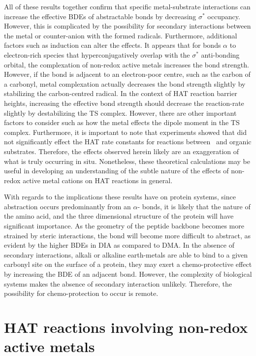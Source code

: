 All of these results together confirm that specific metal-substrate interactions
can increase the effective BDEs of abstractable  bonds by decreasing
 $\sigma^*$ occupancy. However, this is complicated by the possibility
for secondary interactions between the metal or counter-anion with the formed
radicals. Furthermore, additional factors such as induction can alter the
effects. It appears that for  bonds $\alpha$ to electron-rich species
that hyperconjugatively overlap with the $\sigma^*$ anti-bonding orbital, the
complexation of non-redox active metals increases the  bond strength.
However, if the  bond is adjacent to an electron-poor centre, such as
the carbon of a carbonyl, metal complexation actually decreases the bond
strength slightly by stabilizing the carbon-centred radical. In the context of
HAT reaction barrier heights, increasing the effective  bond strength
should decrease the reaction-rate slightly by destabilizing the TS complex.
However, there are other important factors to consider such as how the metal
effects the dipole moment in the TS complex. Furthermore, it is important to
note that experiments showed that  did not significantly effect the
HAT rate constants for reactions between \cumo\ and organic substrates.
Therefore, the effects observed herein likely are an exaggeration of what is
truly occurring in situ. Nonetheless, these theoretical calculations may be
useful in developing an understanding of the subtle nature of the effects of
non-redox active metal cations on HAT reactions in general.

With regards to the implications these results have on protein systems, since
abstraction occurs predominantly from an $\alpha$- bonds, it is likely
that the nature of the amino acid, and the three dimensional structure of the
protein will have significant importance. As the geometry of the peptide
backbone becomes more strained by steric interactions, the  bond will
become more difficult to abstract, as evident by the higher  BDEs in DIA
as compared to DMA. In the absence of secondary interactions, alkali or alkaline
earth-metals are able to bind to a given carbonyl site on the surface of a
protein, they may exert a chemo-protective effect by increasing the BDE of an
adjacent  bond. However, the complexity of biological systems makes the
absence of secondary interaction unlikely. Therefore, the possibility for
chemo-protection to occur is remote.

\section{HAT reactions involving non-redox active metals}

